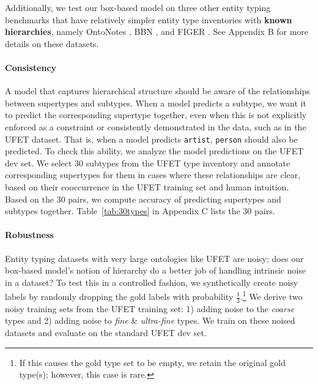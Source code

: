 \documentclass[11pt,a4paper]{article}
\begin{document}
Additionally, we test our box-based model on three other entity typing benchmarks that have relatively simpler entity type inventories with \textbf{known hierarchies}, namely OntoNotes \citep{Dan_Gillick_14}, BBN \citep{bbn} , and FIGER \citep{Xiao_Ling_12}. See Appendix B for more details on these datasets.



\paragraph{Consistency} A model that captures hierarchical structure should be aware of the relationships between supertypes and subtypes. When a model predicts a subtype, we want it to predict the corresponding supertype together, even when this is not explicitly enforced as a constraint or consistently demonstrated in the data, such as in the UFET dataset. That is, when a model predicts {\tt artist}, {\tt person} should also be predicted. To check this ability, we analyze the model predictions on the UFET dev set. We select 30 subtypes from the UFET type inventory and annotate corresponding supertypes for them in cases where these relationships are clear, based on their cooccurrence in the UFET training set and human intuition. Based on the 30 pairs, we compute accuracy of predicting supertypes and subtypes together. Table~\ref{tab:30types} in Appendix C lists the 30 pairs.  

\paragraph{Robustness} Entity typing datasets with very large ontologies like UFET are noisy; does our box-based model's notion of hierarchy do a better job of handling intrinsic noise in a dataset? To test this in a controlled fashion, we synthetically create noisy labels by randomly dropping the gold labels with probability $\tfrac{1}{3}$.\footnote{If this causes the gold type set to be empty, we retain the original gold type(s); however, this case is rare.} We derive two noisy training sets from the UFET training set: 1) adding noise to the \emph{coarse} types and 2) adding noise to \emph{fine} \& \emph{ultra-fine} types. We train on these noised datasets and evaluate on the standard UFET dev set.%
 
\end{document}
